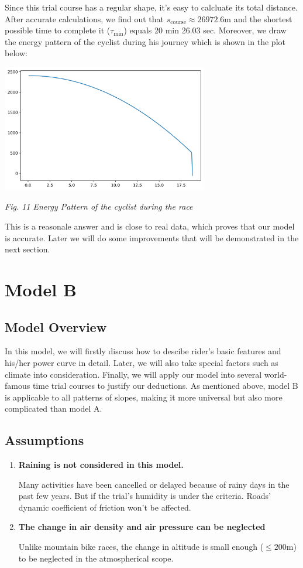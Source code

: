 \documentclass{article}
\begin{document}
			Since this trial course has a regular shape, it's easy to calcluate its total distance. After accurate calculations, we find out that $s_\mathrm{course}\approx26972.6\mathrm{m}$ and the shortest possible time to complete it ($\tau_\mathrm{min}$) equals 20 min 26.03 sec. Moreover, we draw the energy pattern of the cyclist during his journey which is shown in the plot below:

			\begin{center}
				\includegraphics[width=9cm]{energy pattern.png}

				\small \textit{Fig. 11 Energy Pattern of the cyclist during the race}
			\end{center}

			This is a reasonale answer and is close to real data, which proves that our model is accurate. Later we will do some improvements that will be demonstrated in the next section.
	\section{Model B}
		\subsection{Model Overview}
			In this model, we will firstly discuss how to descibe rider's basic features and his/her power curve in detail. Later, we will also take special factors such as climate into consideration. Finally, we will apply our model into several world-famous time trial courses to justify our deductions. As mentioned above, model B is applicable to all patterns of slopes, making it more universal but also more complicated than model A.
		\subsection{Assumptions}
			\begin{enumerate}
				\item	\textbf{Raining is not considered in this model.}

						Many activities have been cancelled or delayed because of rainy days in the past few years. But if the trial's humidity is under the criteria. Roads' dynamic coefficient of friction won't be affected.
				\item \textbf{The change in air density and air pressure can be neglected}

						Unlike mountain bike races, the change in altitude is small enough (\(\leq 200\mathrm{m}\)) to be neglected in the atmospherical scope.

			\end{enumerate}
\end{document}
